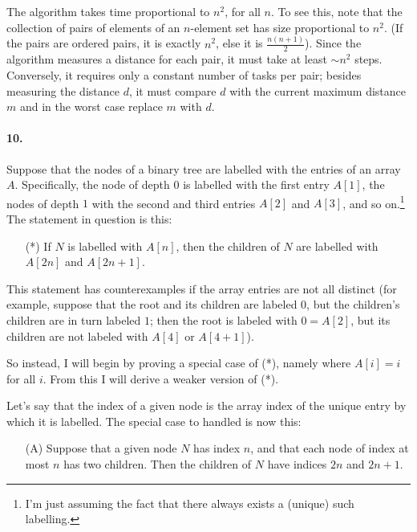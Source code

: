 \documentclass[
]{article}
\begin{document}
The algorithm takes time proportional to \(n^2\), for all \(n\). To see
this, note that the collection of pairs of elements of an \(n\)-element
set has size proportional to \(n^2\). (If the pairs are ordered pairs,
it is exactly \(n^2\), else it is \(\frac{n(n+1)}{2}\)). Since the
algorithm measures a distance for each pair, it must take at least
\(\sim n^2\) steps. Conversely, it requires only a constant number of
tasks per pair; besides measuring the distance \(d\), it must compare
\(d\) with the current maximum distance \(m\) and in the worst case
replace \(m\) with \(d\).

\hypertarget{section-3}{%
\paragraph{10.}\label{section-3}}

Suppose that the nodes of a binary tree are labelled with the entries of
an array \(A\). Specifically, the node of depth \(0\) is labelled with
the first entry \(A[1]\), the nodes of depth \(1\) with the second and
third entries \(A[2]\) and \(A[3]\), and so on.\footnote{I'm just assuming the fact that there always exists a (unique) such labelling.} The statement in question is this:
\begin{itemize}
\item[(*)] If $N$ is labelled with $A[n]$, then the children of $N$ are labelled with $A[2n]$ and $A[2n+1]$.
\end{itemize}
This statement has counterexamples if the array entries are not all distinct (for example, suppose that the root and its children are labeled $0$, but the children's children are in turn labeled $1$; then the root is labeled with $0=A[2]$, but its children are not labeled with $A[4]$ or $A[4+1]$).

So instead, I will begin by proving a special case of (*), namely where $A[i]=i$ for all $i$.  From this I will derive a weaker version of (*).

Let's say that the index of a given node is the array index of the unique entry by which
it is labelled. The special case to handled is now this:
\begin{itemize}
\item[(A)] Suppose that a given node $N$ has index $n$,
  and that each node of index at most $n$ has two children.
  Then the children of $N$ have indices $2n$ and $2n+1$.
\end{itemize}
\end{document}
